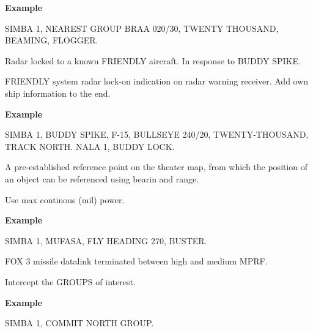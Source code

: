 \begin{tcoloritemize}
    \medskip
    \textbf{Example}
    \begin{center}
        \begin{minipage}{0.9\textwidth}
            SIMBA 1, NEAREST GROUP BRAA 020/30,
            TWENTY THOUSAND,
            BEAMING,
            FLOGGER.
        \end{minipage}
    \end{center}

    Radar locked to a known FRIENDLY aircraft. In response to BUDDY SPIKE.
    
    FRIENDLY system radar lock-on indication on radar warning receiver. 
    Add own ship information to the end.
    
    \medskip
    \textbf{Example}
    \begin{center}
        \begin{minipage}{0.9\textwidth}
            SIMBA 1, BUDDY SPIKE, F-15,
            BULLSEYE 240/20,
            TWENTY-THOUSAND,
            TRACK NORTH.\newline
            NALA 1, BUDDY LOCK.
        \end{minipage}
    \end{center}

    \blueitem[BULLSEYE] 
    A pre-established reference point on the theater map, from which the position 
    of an object can be referenced using bearin and range.

    \blueitem[BUSTER] 
    Use max continous (mil) power.

    \medskip
    \textbf{Example}
    \begin{center}
        \begin{minipage}{0.9\textwidth}
            SIMBA 1, MUFASA, FLY HEADING 270, BUSTER.
        \end{minipage}
    \end{center}

    \blueitem[CHEAPSHOT] 
    FOX 3 missile datalink terminated between high and medium MPRF.

    \blueitem[COMMIT] 
    Intercept the GROUPS of interest.

    \medskip
    \textbf{Example}
    \begin{center}
        \begin{minipage}{0.9\textwidth}
            SIMBA 1, COMMIT NORTH GROUP.
        \end{minipage}
    \end{center}


\end{tcoloritemize}
